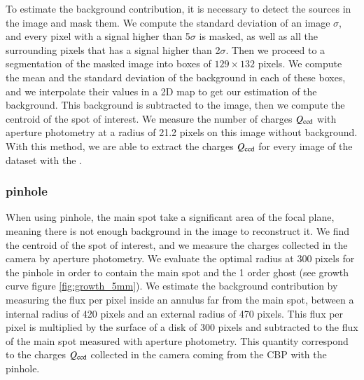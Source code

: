 To estimate the background contribution, it is necessary to detect the sources in the image and mask them. We compute the standard deviation of an image $\sigma$, and every pixel with a signal higher than 5$\sigma$ is masked, as well as all the surrounding pixels that has a signal higher than 2$\sigma$. Then we proceed to a segmentation of the masked image into boxes of $129\times132$ pixels. We compute the mean and the standard deviation of the background in each of these boxes, and we interpolate their values in a 2D map to get our estimation of the background. This background is subtracted to the image, then we compute the centroid of the spot of interest. We measure the number of charges $Q_{\mathrm{ccd}}$ with aperture photometry at a radius of 21.2 pixels on this image without background. With this method, we are able to extract the charges $Q_{\mathrm{ccd}}$ for every image of the dataset with the \spinhole.


\subsubsection{\bpinhole pinhole}

When using \bpinhole pinhole, the main spot take a significant area of the focal plane, meaning there is not enough background in the image to reconstruct it. We find the centroid of the spot of interest, and we measure the charges collected in the \SD camera by aperture photometry. We evaluate the optimal radius at 300 pixels for the \bpinhole pinhole in order to contain the main spot and the 1 order ghost (see growth curve figure \ref{fig:growth_5mm}). We estimate the background contribution by measuring the flux per pixel inside an annulus far from the main spot, between a internal radius of 420 pixels and an external radius of 470 pixels. This flux per pixel is multiplied by the surface of a disk of 300 pixels and subtracted to the flux of the main spot measured with aperture photometry. This quantity correspond to the charges $Q_{\mathrm{ccd}}$ collected in the \SD camera coming from the CBP with the \bpinhole pinhole.

